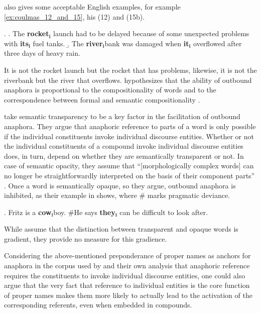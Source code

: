 \citeauthor{Coulmas:1988} also gives some
acceptable English examples, for example \ref{ex:coulmas_12_and_15}, his (12) and
(15b). 

\ex. \label{ex:coulmas_12_and_15}
\a. The \textbf{rocket}$_{\mathbf{i}}$ launch had to be delayed because of some unexpected problems
with \textbf{its}$_{\mathbf{i}}$ fuel tanks.
 \b. The \textbf{river}$_{\mathbf{i}}$bank was damaged when \textbf{it}$_{\mathbf{i}}$ overflowed after three days of
heavy rain.

It is not the rocket launch but the rocket that has problems,
likewise, it is not the riverbank but the river that overflows. \citeauthor{Coulmas:1988} 
hypothesizes that the ability of outbound anaphora is proportional to the
compositionality of words and to the correspondence between formal and
semantic compositionality \citeyearpar[321]{Coulmas:1988}.

\citet{Wardetal:1991} take semantic transparency to be a key factor in
the facilitation of outbound anaphora. They argue that anaphoric
reference to parts of a word is only possible if the individual
constituents invoke individual discourse entities. Whether or not the
individual constituents of a compound invoke individual discourse
entities does, in turn, depend on whether they are semantically
transparent or not. In case of semantic opacity, they assume that ``[morphologically complex words]
can no longer be straightforwardly interpreted on the basis of their
component parts''  \citet[454]{Wardetal:1991}. 
Once a word is
semantically opaque, so they argue, outbound anaphora is inhibited, as
their example in \Next shows, where \# marks pragmatic deviance.

\ex. Fritz is a \textbf{cow}$_{\mathbf{i}}$boy. \#He says \textbf{they}$_{\mathbf{i}}$ can be difficult to look after.

While \citet[455]{Wardetal:1991} assume that the distinction
between transparent and opaque words is gradient, they provide no
measure for this gradience. 

Considering the above-mentioned preponderance of proper names as
anchors for anaphora in the
corpus used by \citet{Wardetal:1991} and their own analysis that
anaphoric reference requires the constituents to invoke individual
discourse entities, one could also argue that the very fact that
reference to individual entities is the core function of proper
names makes them more likely to actually lead to the activation of
the corresponding referents, even when embedded in compounds. 

